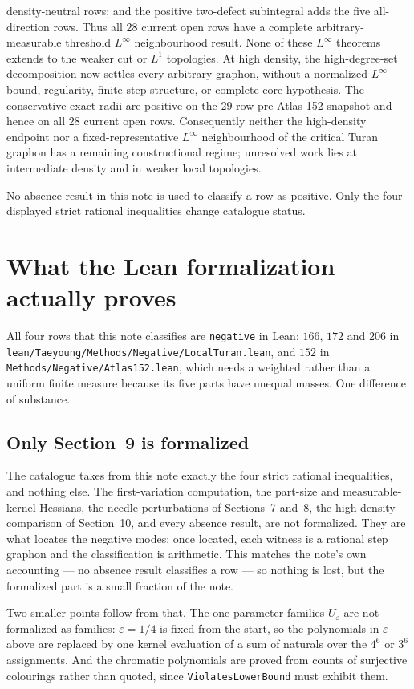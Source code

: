 \documentclass[11pt]{article}
\begin{document}
density-neutral rows; and the positive two-defect subintegral adds the five
all-direction rows.  Thus all $28$ current open rows have a complete
arbitrary-measurable threshold $L^\infty$ neighbourhood result.
None of these $L^\infty$ theorems
extends to the weaker cut or $L^1$ topologies.
At high density, the high-degree-set decomposition now settles every
arbitrary graphon, without a normalized $L^\infty$ bound, regularity,
finite-step structure, or complete-core hypothesis.  The conservative exact
radii are positive on the 29-row pre-Atlas-152 snapshot and hence on all $28$
current open rows.  Consequently neither the high-density endpoint nor a
fixed-representative $L^\infty$ neighbourhood of the critical Turan graphon
has a remaining constructional regime; unresolved work lies at intermediate
density and in weaker local topologies.

No absence result in this note is used to classify a row as positive.  Only
the four displayed strict rational inequalities change catalogue status.

\appendix
\section{What the Lean formalization actually proves}

All four rows that this note classifies are \texttt{negative} in Lean:
$166$, $172$ and $206$ in
\texttt{lean/Taeyoung/Methods/Negative/LocalTuran.lean}, and $152$ in
\texttt{Methods/Negative/Atlas152.lean}, which needs a weighted rather than a
uniform finite measure because its five parts have unequal masses.  One
difference of substance.

\subsection*{Only Section~9 is formalized}

The catalogue takes from this note exactly the four strict rational
inequalities, and nothing else.  The first-variation computation, the part-size
and measurable-kernel Hessians, the needle perturbations of Sections~7 and~8,
the high-density comparison of Section~10, and every absence result, are not
formalized.  They are what locates the negative modes; once located, each
witness is a rational step graphon and the classification is arithmetic.  This
matches the note's own accounting --- no absence result classifies a row --- so
nothing is lost, but the formalized part is a small fraction of the note.

Two smaller points follow from that.  The one-parameter families
$U_\varepsilon$ are not formalized as families: $\varepsilon=1/4$ is fixed from
the start, so the polynomials in $\varepsilon$ above are replaced by one kernel
evaluation of a sum of naturals over the $4^6$ or $3^6$ assignments.  And the
chromatic polynomials are proved from counts of surjective colourings rather
than quoted, since \texttt{ViolatesLowerBound} must exhibit them.
\end{document}
